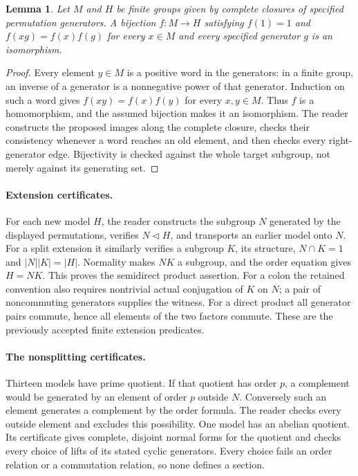 \documentclass[11pt]{article}
\newtheorem{lemma}{Lemma}
\begin{document}
\begin{lemma}
Let $M$ and $H$ be finite groups given by complete closures of specified
permutation generators. A bijection $f:M\to H$ satisfying $f(1)=1$ and
$f(xg)=f(x)f(g)$ for every $x\in M$ and every specified generator $g$ is
an isomorphism.
\end{lemma}
\begin{proof}
Every element $y\in M$ is a positive word in the generators: in a finite
group, an inverse of a generator is a nonnegative power of that generator.
Induction on such a word gives $f(xy)=f(x)f(y)$ for every $x,y\in M$.
Thus $f$ is a homomorphism, and the assumed bijection makes it an
isomorphism. The reader constructs the proposed images along the complete
closure, checks their consistency whenever a word reaches an old element,
and then checks every right-generator edge. Bijectivity is checked against
the whole target subgroup, not merely against its generating set.
\end{proof}

\paragraph{Extension certificates.}
For each new model $H$, the reader constructs the subgroup $N$ generated by
the displayed permutations, verifies $N\triangleleft H$, and transports an
earlier model onto $N$. For a split extension it similarly verifies a
subgroup $K$, its structure, $N\cap K=1$ and $|N||K|=|H|$. Normality makes
$NK$ a subgroup, and the order equation gives $H=NK$. This proves the
semidirect product assertion. For a colon the retained convention also
requires nontrivial actual conjugation of $K$ on $N$; a pair of
noncommuting generators supplies the witness. For a direct product all
generator pairs commute, hence all elements of the two factors commute.
These are the previously accepted finite extension predicates.

\paragraph{The nonsplitting certificates.}
Thirteen models have prime quotient. If that quotient has order $p$, a
complement would be generated by an element of order $p$ outside $N$.
Conversely such an element generates a complement by the order formula.
The reader checks every outside element and excludes this possibility.
One model has an abelian quotient. Its certificate gives complete,
disjoint normal forms for the quotient and checks every choice of lifts
of its stated cyclic generators. Every choice fails an order relation
or a commutation relation, so none defines a section.
\end{document}
